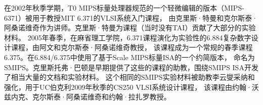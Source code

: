 在2002年秋季学期，T0 MIPS标量处理器规范的一个轻微编辑的版本（MIPS-6371）被用于教授MIT 6.371的VLSI系统入门课程，
由克里斯·特曼和克尔斯泰·阿桑诺维奇作为讲师。克里斯·特曼为课程（当时没有TAI）贡献了大部分的实验材料。
2005年春季，在麻省理工学院，6.371课程演化为实验性的6.884复杂数字设计课程，由阿文和克尔斯泰·阿桑诺维奇教授，
该课程成为一个常规的春季课程6.375。在6.884/6.375中使用了基于Scale MIPS标量ISA的一个约简版本，
命名为SMIPS。克里斯托弗·巴顿是早期提供了这些的课程的助教，围绕SMIPS ISA开发了相当大量的文档和实验材料。
这个相同的SMIPS实验材料被助教李云燮采纳和强化，用于UC伯克利2009年秋季的CS250 VLSI系统设计课程，
该课程由约翰·沃兹内克、克尔斯泰·阿桑诺维奇和约翰·拉扎罗教授。

